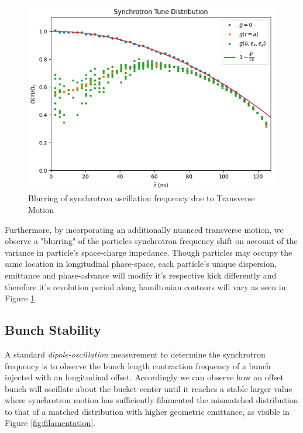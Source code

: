 \begin{figure}
    \centering
    \includegraphics{figs/tune_blurr/normalized_tune.png}
    \caption{Blurring of synchrotron oscillation frequency due to Transverse Motion}
    \label{fig:tune_dist_blur}
\end{figure}

Furthermore, by incorporating an additionally nuanced transverse motion, we observe a "blurring" of the particles synchrotron frequency shift on account of the variance in particle's space-charge impedance. Though particles may occupy the same location in longitudinal phase-space, each particle's unique dispersion, emittance and phase-advance will modify it's respective kick differently and therefore it's revolution period along hamiltonian contours will vary as seen in Figure \ref{fig:tune_dist_blur}.

\subsection{Bunch Stability}

A standard \textit{dipole-oscillation} measurement to determine the synchrotron frequency is to observe the bunch length contraction frequency of a bunch injected with an longitudinal offset. Accordingly we can observe how an offset bunch will oscillate about the bucket center until it reaches a stable larger value where synchrotron motion has sufficiently filamented the mismatched distribution to that of a matched distribution with higher geometric emittance, as visible in Figure \ref{fig:filamentation}.

